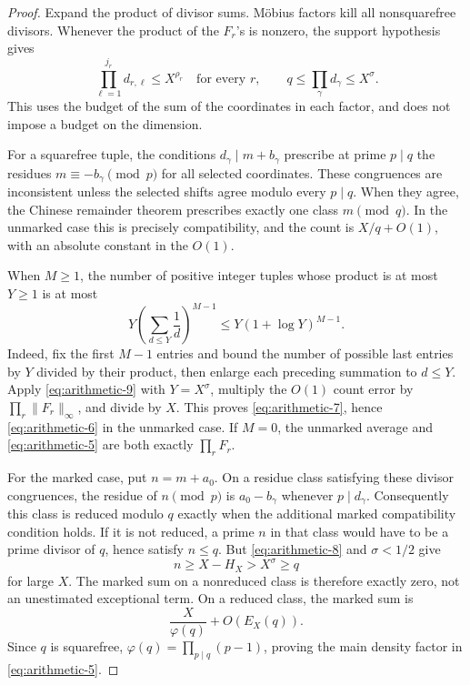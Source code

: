 \begin{proof} Expand the product of divisor sums. M\"obius factors kill all nonsquarefree divisors. Whenever the product of the $F_r$'s is nonzero, the support hypothesis gives
\begin{equation}
\prod_{\ell=1}^{j_r}d_{r,\ell}\le X^{\rho_r}
\quad\text{for every }r,
\qquad
q\le\prod_\gamma d_\gamma\le X^\sigma.
\label{eq:arithmetic-8}
\end{equation}
This uses the budget of the sum of the coordinates in each factor, and does not impose a budget on the dimension.

For a squarefree tuple, the conditions $d_\gamma\mid m+b_\gamma$ prescribe at prime $p\mid q$ the residues $m\equiv-b_\gamma\pmod p$ for all selected coordinates. These congruences are inconsistent unless the selected shifts agree modulo every $p\mid q$. When they agree, the Chinese remainder theorem prescribes exactly one class $m\pmod q$. In the unmarked case this is precisely compatibility, and the count is $X/q+O(1)$, with an absolute constant in the $O(1)$.

When $M\ge1$, the number of positive integer tuples whose product is at most $Y\ge1$ is at most
\begin{equation}
Y\left(\sum_{d\le Y}\frac1d\right)^{M-1}
 \le Y(1+\log Y)^{M-1}.
\label{eq:arithmetic-9}
\end{equation}
Indeed, fix the first $M-1$ entries and bound the number of possible last entries by $Y$ divided by their product, then enlarge each preceding summation to $d\le Y$. Apply \eqref{eq:arithmetic-9} with $Y=X^\sigma$, multiply the $O(1)$ count error by $\prod_r\|F_r\|_\infty$, and divide by $X$. This proves \eqref{eq:arithmetic-7}, hence \eqref{eq:arithmetic-6} in the unmarked case. If $M=0$, the unmarked average and \eqref{eq:arithmetic-5} are both exactly $\prod_rF_r$.

For the marked case, put $n=m+a_0$. On a residue class satisfying these divisor congruences, the residue of $n\pmod p$ is $a_0-b_\gamma$ whenever $p\mid d_\gamma$. Consequently this class is reduced modulo $q$ exactly when the additional marked compatibility condition holds. If it is not reduced, a prime $n$ in that class would have to be a prime divisor of $q$, hence satisfy $n\le q$. But \eqref{eq:arithmetic-8} and $\sigma<1/2$ give
\[
n\ge X-H_X> X^\sigma\ge q
\]
for large $X$. The marked sum on a nonreduced class is therefore exactly zero, not an unestimated exceptional term. On a reduced class, the marked sum is
\[
\frac X{\varphi(q)}+O(E_X(q)).
\]
Since $q$ is squarefree, $\varphi(q)=\prod_{p\mid q}(p-1)$, proving the main density factor in \eqref{eq:arithmetic-5}.


\end{proof}
